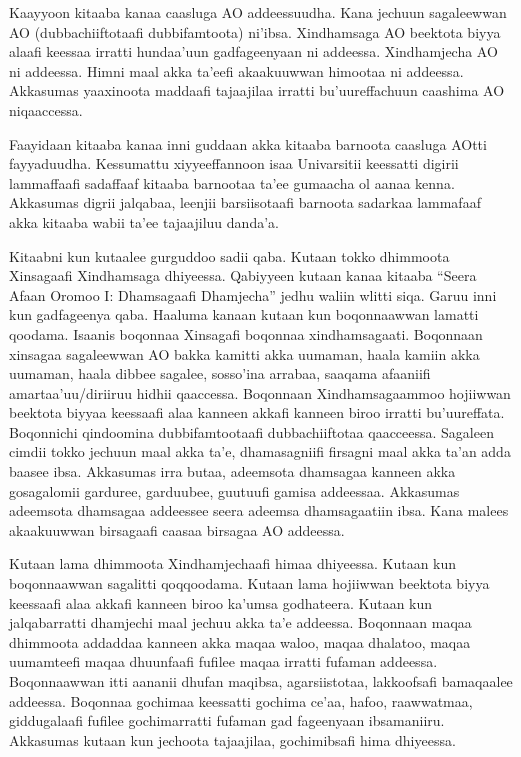 \documentclass[11pt,b5paper]{book}
\begin{document}
Kaayyoon kitaaba kanaa caasluga AO addeessuudha. Kana jechuun sagaleewwan AO (dubbachiiftotaafi dubbifamtoota) ni’ibsa. Xindhamsaga AO beektota biyya alaafi keessaa irratti
hundaa’uun gadfageenyaan ni addeessa. Xindhamjecha AO ni addeessa. Himni maal akka ta’eefi akaakuuwwan himootaa ni addeessa. Akkasumas yaaxinoota maddaafi tajaajilaa irratti
bu’uureffachuun caashima AO niqaaccessa.

Faayidaan kitaaba kanaa inni guddaan akka kitaaba barnoota caasluga AOtti fayyaduudha. Kessumattu xiyyeeffannoon isaa Univarsitii keessatti digirii lammaffaafi sadaffaaf kitaaba
barnootaa ta’ee gumaacha ol aanaa kenna. Akkasumas digrii jalqabaa, leenjii barsiisotaafi barnoota sadarkaa lammafaaf akka kitaaba wabii ta’ee tajaajiluu danda’a.

Kitaabni kun kutaalee gurguddoo sadii qaba. Kutaan tokko dhimmoota Xinsagaafi Xindhamsaga dhiyeessa. Qabiyyeen kutaan kanaa kitaaba “Seera Afaan Oromoo I: Dhamsagaafi Dhamjecha” jedhu waliin wlitti siqa. Garuu inni kun gadfageenya qaba. Haaluma kanaan kutaan kun boqonnaawwan lamatti qoodama. Isaanis boqonnaa Xinsagafi boqonnaa xindhamsagaati. Boqonnaan xinsagaa sagaleewwan AO bakka kamitti akka uumaman, haala kamiin akka uumaman, haala dibbee sagalee, sosso’ina arrabaa, saaqama afaaniifi amartaa’uu/diriiruu hidhii qaaccessa. Boqonnaan Xindhamsagaammoo hojiiwwan beektota biyyaa keessaafi alaa kanneen akka\cite{lloret1988gemination,griefenow2001grammatical,owens1985grammar,tolemariam2011,wako1981,biniyam1988,kebede1994}fi kanneen biroo irratti bu’uureffata. Boqonnichi qindoomina dubbifamtootaafi
dubbachiiftotaa qaacceessa. Sagaleen cimdii tokko jechuun maal akka ta’e, dhamasagniifi firsagni maal akka ta’an adda baasee ibsa. Akkasumas irra butaa, adeemsota dhamsagaa
kanneen akka gosagalomii garduree, garduubee, guutuufi gamisa addeessaa. Akkasumas adeemsota dhamsagaa addeessee seera adeemsa dhamsagaatiin ibsa. Kana malees
akaakuuwwan birsagaafi caasaa birsagaa AO addeessa.

Kutaan lama dhimmoota Xindhamjechaafi himaa dhiyeessa. Kutaan kun boqonnaawwan sagalitti qoqqoodama. Kutaan lama hojiiwwan beektota biyya keessaafi alaa akka\cite{abera1982,temesgen1993,Addunya2018,owens1985grammar,gragg1976oromo,beekamaa1996,griefenow2001grammatical,file2015,baye1988focus,tolemariam2011,Abdusamad1994,aadaa1995}fi kanneen biroo ka’umsa godhateera. Kutaan kun jalqabarratti dhamjechi maal jechuu akka ta’e addeessa. Boqonnaan maqaa dhimmoota addaddaa kanneen akka maqaa waloo, maqaa dhalatoo, maqaa uumamteefi maqaa dhuunfaafi fufilee maqaa irratti fufaman
addeessa. Boqonnaawwan itti aananii dhufan maqibsa, agarsiistotaa, lakkoofsafi bamaqaalee addeessa. Boqonnaa gochimaa keessatti gochima ce’aa, hafoo, raawwatmaa, giddugalaafi fufilee gochimarratti fufaman gad fageenyaan ibsamaniiru. Akkasumas kutaan kun jechoota tajaajilaa, gochimibsafi hima dhiyeessa.
\end{document}
